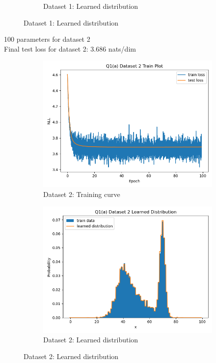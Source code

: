 \documentclass{article}
\begin{document}
\begin{enumerate}[(a)]
\begin{figure}[H]
\begin{subfigure}{0.4\textwidth}
        \caption{Dataset 1: Learned distribution}
    \end{subfigure}
\end{figure}
100 parameters for dataset 2 \\
Final test loss for dataset 2: 3.686 nats/dim
\begin{figure}[H]
    \centering
    \begin{subfigure}{0.4\textwidth}
        \centering
        \includegraphics[width=\textwidth]{figures/q1_a_dset2_train_plot.png}
        \caption{Dataset 2: Training curve}
    \end{subfigure}
    \hspace{0.2in}
    \begin{subfigure}{0.4\textwidth}
        \centering
        \includegraphics[width=\textwidth]{figures/q1_a_dset2_learned_dist.png}
        \caption{Dataset 2: Learned distribution}
    \end{subfigure}
\end{figure}


\end{enumerate}
\end{document}
